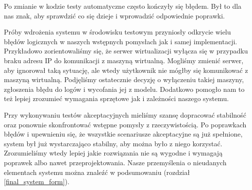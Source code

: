 \documentclass[../analiza-rozwiazania.tex]{subfiles}
\begin{document}
Po zmianie w kodzie testy automatyczne często kończyły się błędem.
Był to dla nas znak, aby sprawdzić co się dzieje i wprowadzić odpowiednie poprawki.

Próby wdrożenia systemu w środowisku testowym przyniosły odkrycie wielu błędów logicznych w naszych wstępnych pomysłach jak i samej implementacji.
Przykładowo zorientowaliśmy się, że serwer wirtualizacji wyłącza się w przypadku braku adresu IP do komunikacji z maszyną wirtualną.
Mogliśmy zmienić serwer, aby ignorował taką sytuację, ale wtedy użytkownik nie mógłby się komunikować z maszyną wirtualną.
Podjęliśmy ostatecznie decyzję o wyłączeniu takiej maszyny, zgłoszenia błędu do logów i wycofania jej z modelu.
Dodatkowo pomogło nam to też lepiej zrozumieć wymagania sprzętowe jak i zależności naszego systemu.

Przy wykonywaniu testów akceptacyjnych mieliśmy szansę dopracować stabilność oraz ponownie skonfrontować wstępne pomysły z rzeczywistością.
Po poprawkach błędów i upewnieniu się, że wszystkie scenariusze akceptacyjne są już spełnione, system był już wystarczająco stabilny, aby można było z niego korzystać.
Zrozumieliśmy wtedy lepiej jakie rozwiązania nie są wygodne i wymagają poprawek albo nawet przeprojektowania.
Nasze przemyślenia o nieudanych elementach systemu można znaleźć w podsumowaniu (rozdział \ref{final_system_form}).
\end{document}
